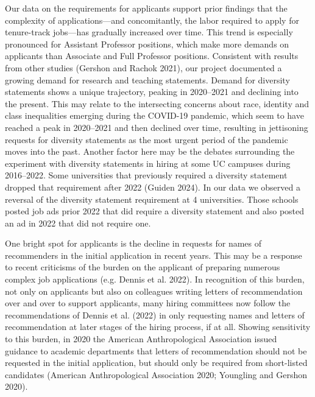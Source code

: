 \documentclass[
  12pt,
]{article}
\begin{document}
Our data on the requirements for applicants support prior findings that
the complexity of applications---and concomitantly, the labor required
to apply for tenure-track jobs---has gradually increased over time. This
trend is especially pronounced for Assistant Professor positions, which
make more demands on applicants than Associate and Full Professor
positions. Consistent with results from other studies (Gershon and
Rachok 2021), our project documented a growing demand for research and
teaching statements. Demand for diversity statements shows a unique
trajectory, peaking in 2020--2021 and declining into the present. This
may relate to the intersecting concerns about race, identity and class
inequalities emerging during the COVID-19 pandemic, which seem to have
reached a peak in 2020--2021 and then declined over time, resulting in
jettisoning requests for diversity statements as the most urgent period
of the pandemic moves into the past. Another factor here may be the
debates surrounding the experiment with diversity statements in hiring
at some UC campuses during 2016--2022. Some universities that previously
required a diversity statement dropped that requirement after 2022
(Guiden 2024). In our data we observed a reversal of the diversity
statement requirement at 4 universities. Those schools posted job ads
prior 2022 that did require a diversity statement and also posted an ad
in 2022 that did not require one.

One bright spot for applicants is the decline in requests for names of
recommenders in the initial application in recent years. This may be a
response to recent criticisms of the burden on the applicant of
preparing numerous complex job applications (e.g. Dennis et al. 2022).
In recognition of this burden, not only on applicants but also on
colleagues writing letters of recommendation over and over to support
applicants, many hiring committees now follow the recommendations of
Dennis et al. (2022) in only requesting names and letters of
recommendation at later stages of the hiring process, if at all. Showing
sensitivity to this burden, in 2020 the American Anthropological
Association issued guidance to academic departments that letters of
recommendation should not be requested in the initial application, but
should only be required from short-listed candidates (American
Anthropological Association 2020; Youngling and Gershon 2020).
\end{document}
